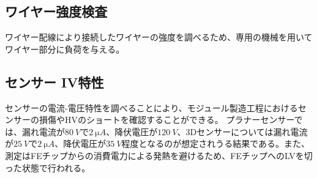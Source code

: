 \subsection{ワイヤー強度検査}
\label{sec:mass}

ワイヤー配線により接続したワイヤーの強度を調べるため、専用の機械を用いてワイヤー部分に負荷を与える。


\subsection{センサー IV特性}
\label{sec:sensoriv}
センサーの電流-電圧特性を調べることにより、モジュール製造工程におけるセンサーの損傷やHVのショートを確認することができる。
プラナーセンサーでは、漏れ電流が$80\ \si{V}$で$2\ \si{\micro A}$、降伏電圧が$120\ \si{V}$、3Dセンサーについては漏れ電流が$25\ \si{V}$で$2\ \si{\micro A}$、降伏電圧が$35\ \si{V}$程度となるのが想定されうる結果である。また、測定はFEチップからの消費電力による発熱を避けるため、FEチップへのLVを切った状態で行われる。


